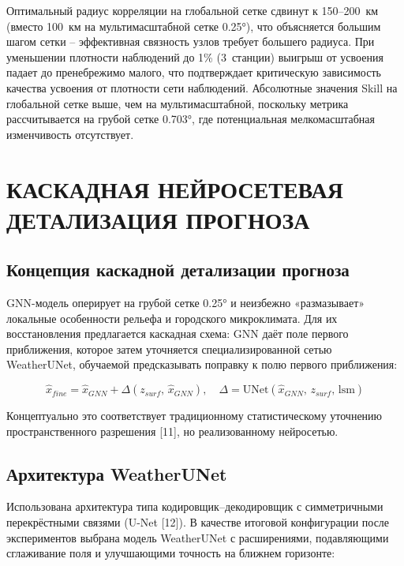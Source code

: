 \documentclass[14pt,a4paper]{extarticle}
\numberwithin{table}{section}
\numberwithin{figure}{section}
\numberwithin{equation}{section}
\begin{document}
Оптимальный радиус корреляции на глобальной сетке сдвинут к
150--200~км (вместо 100~км на мультимасштабной сетке 0.25°),
что объясняется большим шагом сетки -- эффективная связность узлов
требует большего радиуса. При уменьшении плотности наблюдений до
1\% (3~станции) выигрыш от усвоения падает до пренебрежимо малого,
что подтверждает критическую зависимость качества усвоения от
плотности сети наблюдений. Абсолютные значения Skill на глобальной
сетке выше, чем на мультимасштабной, поскольку метрика
рассчитывается на грубой сетке 0.703°, где потенциальная
мелкомасштабная изменчивость отсутствует.


\newpage

\section{КАСКАДНАЯ НЕЙРОСЕТЕВАЯ ДЕТАЛИЗАЦИЯ ПРОГНОЗА}\label{ux43aux430ux441ux43aux430ux434ux43dux44bux439-ux43dux435ux439ux440ux43eux441ux435ux442ux435ux432ux43eux439-downscaler}

\subsection{Концепция каскадной детализации прогноза}\label{ux43aux43eux43dux446ux435ux43fux446ux438ux44f-ux43aux430ux441ux43aux430ux434ux43dux43eux433ux43e-downscaling}

GNN-модель оперирует на грубой сетке 0.25° и неизбежно «размазывает»
локальные особенности рельефа и городского микроклимата. Для их
восстановления предлагается каскадная схема: GNN даёт поле
первого приближения, которое затем уточняется специализированной сетью
WeatherUNet, обучаемой предсказывать поправку к полю первого
приближения:

\[\hat{x}_{fine} = \hat{x}_{GNN} + \Delta(z_{surf},\, \hat{x}_{GNN}), \quad \Delta = \text{UNet}(\hat{x}_{GNN},\, z_{surf},\, \text{lsm})\]

Концептуально это соответствует традиционному статистическому уточнению пространственного разрешения {[}11{]}, но реализованному нейросетью.

\subsection{Архитектура WeatherUNet}\label{ux430ux440ux445ux438ux442ux435ux43aux442ux443ux440ux430-weatherunet}

Использована архитектура типа кодировщик--декодировщик с
симметричными перекрёстными связями (U-Net {[}12{]}). В качестве
итоговой конфигурации после экспериментов выбрана модель WeatherUNet
с расширениями, подавляющими сглаживание поля и улучшающими
точность на ближнем горизонте:
\end{document}

